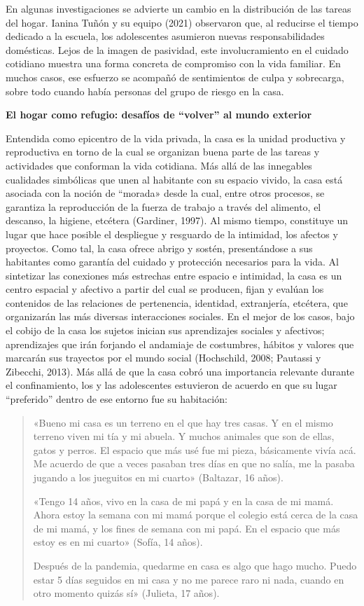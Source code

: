 En algunas investigaciones se advierte un cambio en la distribución de las tareas del hogar. Ianina Tuñón y su equipo (2021) observaron que, al reducirse el tiempo dedicado a la escuela, los adolescentes asumieron nuevas responsabilidades domésticas. Lejos de la imagen de pasividad, este involucramiento en el cuidado cotidiano muestra una forma concreta de compromiso con la vida familiar. En muchos casos, ese esfuerzo se acompañó de sentimientos de culpa y sobrecarga, sobre todo cuando había personas del grupo de riesgo en la casa.

\textbf{El hogar como refugio: desafíos de ``volver'' al mundo exterior}

Entendida como epicentro de la vida privada, la casa es la unidad productiva y reproductiva en torno de la cual se organizan buena parte de las tareas y actividades que conforman la vida cotidiana. Más allá de las innegables cualidades simbólicas que unen al habitante con su espacio vivido, la casa está asociada con la noción de ``morada» desde la cual, entre otros procesos, se garantiza la reproducción de la fuerza de trabajo a través del alimento, el descanso, la higiene, etcétera (Gardiner, 1997). Al mismo tiempo, constituye un lugar que hace posible el despliegue y resguardo de la intimidad, los afectos y proyectos. Como tal, la casa ofrece abrigo y sostén, presentándose a sus habitantes como garantía del cuidado y protección necesarios para la vida. Al sintetizar las conexiones más estrechas entre espacio e intimidad, la casa es un centro espacial y afectivo a partir del cual se producen, fijan y evalúan los contenidos de las relaciones de pertenencia, identidad, extranjería, etcétera, que organizarán las más diversas interacciones sociales. En el mejor de los casos, bajo el cobijo de la casa los sujetos inician sus aprendizajes sociales y afectivos; aprendizajes que irán forjando el andamiaje de costumbres, hábitos y valores que marcarán sus trayectos por el mundo social (Hochschild, 2008; Pautassi y Zibecchi, 2013). Más allá de que la casa cobró una importancia relevante durante el confinamiento, los y las adolescentes estuvieron de acuerdo en que su lugar ``preferido'' dentro de ese entorno fue su habitación:

\begin{quote}
«Bueno mi casa es un terreno en el que hay tres casas. Y en el mismo terreno viven mi tía y mi abuela. Y muchos animales que son de ellas, gatos y perros. El espacio que más usé fue mi pieza, básicamente vivía acá. Me acuerdo de que a veces pasaban tres días en que no salía, me la pasaba jugando a los jueguitos en mi cuarto» (Baltazar, 16 años).

«Tengo 14 años, vivo en la casa de mi papá y en la casa de mi mamá. Ahora estoy la semana con mi mamá porque el colegio está cerca de la casa de mi mamá, y los fines de semana con mi papá. En el espacio que más estoy es en mi cuarto» (Sofía, 14 años).

Después de la pandemia, quedarme en casa es algo que hago mucho. Puedo estar 5 días seguidos en mi casa y no me parece raro ni nada, cuando en otro momento quizás sí» (Julieta, 17 años).
\end{quote}

